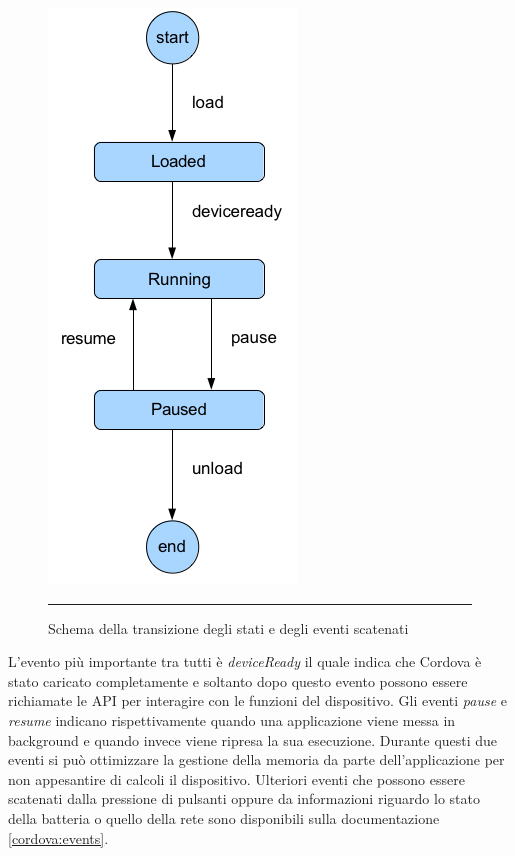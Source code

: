 \begin{figure}[htbp]
  \centering
    \includegraphics[scale=0.6]{Figures/cordova_application_states.png}  
    \rule{35em}{0.5pt}
  \caption[Stati di una applicazione]{Schema della transizione degli stati e degli eventi scatenati}
  \label{fig:cordova_app_states}
\end{figure}

L'evento più importante tra tutti è \emph{deviceReady} il quale indica che Cordova è stato caricato completamente e soltanto dopo questo evento possono essere richiamate le API per interagire con le funzioni del dispositivo. Gli eventi \emph{pause} e \emph{resume} indicano rispettivamente quando una applicazione viene messa in background e quando invece viene ripresa la sua esecuzione. Durante questi due eventi si può ottimizzare la gestione della memoria da parte dell'applicazione per non appesantire di calcoli il dispositivo. Ulteriori eventi che possono essere scatenati dalla pressione di pulsanti oppure da informazioni riguardo lo stato della batteria o quello della rete sono disponibili sulla documentazione \ref{cordova:events}.

